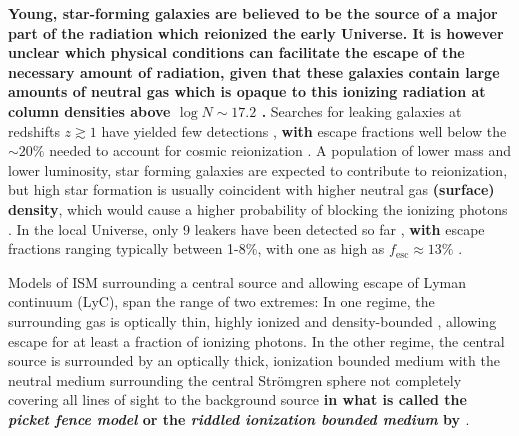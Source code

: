 \documentclass[twocolumn, trackchanges]{aastex61}
\begin{document}
\textbf{Young, star-forming galaxies are believed to be the source of a major
part of the radiation which reionized the early Universe. It is however
unclear which physical conditions can facilitate the escape of the
necessary amount of radiation, given that these galaxies contain large
amounts of neutral gas which is opaque to this ionizing radiation at
column densities above $\log N \sim 17.2$ \citep{Verhamme2015}.}
Searches for leaking galaxies at redshifts $z \gtrsim 1$ have yielded few 
detections
\citep[e.g.][]{Iwata2009, Vanzella2010, Vanzella2012, Nestor2013, Cowie2009, 
Siana2010},
\textbf{with} escape fractions well below the $\sim 20\%$ needed to account for
cosmic reionization \citep{Bouwens2011, Robertson2013}. A population of
lower mass and lower luminosity, star forming galaxies are expected to
contribute to reionization, but high star formation is usually
coincident with higher neutral gas \textbf{(surface)
density}, which would cause a higher probability of blocking the ionizing 
photons \citep[e.g.][]{Erb2016, Robertson2013}. In the local Universe, only 9
leakers have been detected so far
\citep{Bergvall2006, Leitet2011, Leitet2013, Borthakur2014, Izotov2016Nat, 
Izotov2016MNRAS, Leitherer2016},
\textbf{with} escape fractions ranging typically between 1-8\%, with one as high as
$f_{\mathrm{esc}} \approx 13\%$ \citep{Izotov2016MNRAS}.

Models of ISM surrounding a central source and allowing escape of Lyman
continuum (LyC), span the range of two extremes: In one regime, the surrounding
gas is optically thin, highly ionized and density-bounded \citep[see
e.g.][]{Jaskot2013}, allowing escape for at least a fraction of
ionizing photons. In the other regime, the central source is surrounded by an
optically thick, ionization bounded medium with the neutral medium surrounding
the central Strömgren sphere not completely covering all lines of sight to the
background source \textbf{in what is called the \emph{picket fence model}
\citep{Conselice2000, Bergvall2006, Heckman2011, Zackrisson2013} or the
\emph{riddled ionization bounded medium} by \cite{Verhamme2015}}.
\end{document}
